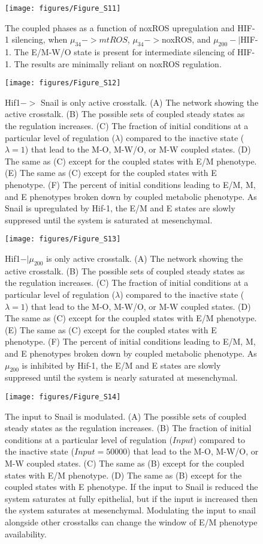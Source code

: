 \documentclass{article}
\begin{document}
\begin{figure}
\texttt{[image: figures/Figure\_S11]}
\caption{The coupled phases as a function of noxROS upregulation and HIF-1 silencing, when $\mu_{34}->mtROS$, $\mu_{34}->$noxROS, and $\mu_{200}-| $HIF-1. The E/M-W/O state is present for intermediate silencing of HIF-1. The results are minimally reliant on noxROS regulation.}
\end{figure}



\begin{figure}
\texttt{[image: figures/Figure\_S12]}
\caption{Hif1$->$ Snail is only active crosstalk. (A) The network showing the active crosstalk. (B) The possible sets of coupled steady states as the regulation increases. (C) The fraction of initial conditions at a particular level of regulation ($\lambda$) compared to the inactive state ($\lambda=1$) that lead to the M-O, M-W/O, or M-W coupled states. (D) The same as (C) except for the coupled states with E/M phenotype. (E) The same as (C) except for the coupled states with E phenotype. (F) The percent of initial conditions leading to E/M, M, and E phenotypes broken down by coupled metabolic phenotype. As Snail is upregulated by Hif-1, the E/M and E states are slowly suppresed until the system is saturated at mesenchymal. }
\end{figure}

\begin{figure}
\texttt{[image: figures/Figure\_S13]}
\caption{Hif1$-| \mu_{200}$ is only active crosstalk. (A) The network showing the active crosstalk. (B) The possible sets of coupled steady states as the regulation increases. (C) The fraction of initial conditions at a particular level of regulation ($\lambda$) compared to the inactive state ($\lambda=1$) that lead to the M-O, M-W/O, or M-W coupled states. (D) The same as (C) except for the coupled states with E/M phenotype. (E) The same as (C) except for the coupled states with E phenotype. (F) The percent of initial conditions leading to E/M, M, and E phenotypes broken down by coupled metabolic phenotype. As $\mu_{200}$ is inhibited by Hif-1, the E/M and E states are slowly suppresed until the system is nearly saturated at mesenchymal. }
\end{figure}


\begin{figure}
\texttt{[image: figures/Figure\_S14]}
\caption{The input to Snail is modulated. (A) The possible sets of coupled steady states as the regulation increases. (B) The fraction of initial conditions at a particular level of regulation ($Input$) compared to the inactive state ($Input=50000$) that lead to the M-O, M-W/O, or M-W coupled states. (C) The same as  (B) except for the coupled states with E/M phenotype. (D) The same as (B) except for the coupled states with E phenotype. If the input to Snail is reduced the system saturates at fully epithelial, but if the input is increased then the system saturates at mesenchymal. Modulating the input to snail alongside other crosstalks can change the window of E/M phenotype availability.}
\end{figure}
\end{document}
